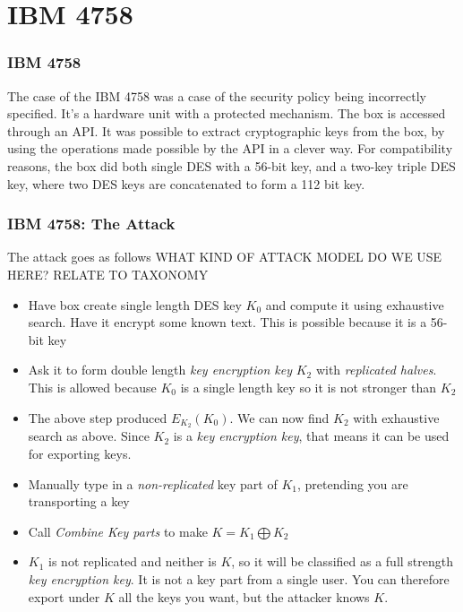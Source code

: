 \section{IBM 4758}
        \begin{frame}
            \frametitle{IBM 4758}
                The case of the IBM 4758 was a case of the security policy being incorrectly specified. 
                It's a hardware unit with a protected mechanism. The box is accessed through an API. It was possible to extract cryptographic keys from the box, by using the operations made possible by the API in a clever way. For compatibility reasons, the box did both single DES with a 56-bit key, and a two-key triple DES key, where two DES keys are concatenated to form a 112 bit key. 
        \end{frame}
        \begin{frame}
            \frametitle{IBM 4758: The Attack}
                The attack goes as follows
                WHAT KIND OF ATTACK MODEL DO WE USE HERE? RELATE TO TAXONOMY
                \begin{itemize}
                    \item Have box create single length DES key $K_0$ and compute it using exhaustive search. Have it encrypt some known text. This is possible because it is a 56-bit key
                    \item Ask it to form double length \textit{key encryption key} $K_2$ with \textit{replicated halves}. This is allowed because $K_0$ is a single length key so it is not stronger than $K_2$
                    \item The above step produced $E_{K_2}(K_0)$. We can now find $K_2$ with exhaustive search as above. Since $K_2$ is a \textit{key encryption key}, that means it can be used for exporting keys. 
                    \item Manually type in a \textit{non-replicated} key part of $K_1$, pretending you are transporting a key
                    \item Call \textit{Combine Key parts} to make $K = K_1 \bigoplus K_2$
                    \item $K_1$ is not replicated and neither is $K$, so it will be classified as a full strength \textit{key encryption key}. It is not a key part from a single user. You can therefore export under $K$ all the keys you want, but the attacker knows $K$.
                \end{itemize}
        \end{frame}


